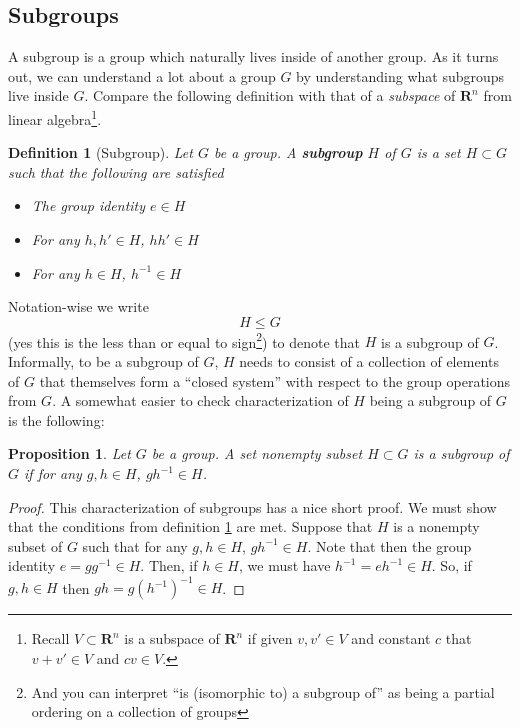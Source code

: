 \documentclass[12pt]{article}
\numberwithin{equation}{subsection}
\newtheorem{prop}[subsection]{Proposition}
\newtheorem{defn}[subsection]{Definition}
\theoremstyle{note}
\begin{document}
\subsection{Subgroups}
A subgroup is a group which naturally lives inside of another group. As it turns out, we can understand a lot about a group $G$ by understanding what subgroups live inside $G$. Compare the following definition with that of a \textit{subspace} of $\mathbf{R}^n$ from linear algebra\footnote{Recall $V\subset \mathbf{R}^n$ is a subspace of $\mathbf{R}^n$ if given $v,v'\in V$ and constant $c$ that $v+v'\in V$ and $cv\in V$.}. 

\begin{defn}[Subgroup] \label{subgroup}
	Let $G$ be a group. A \textbf{subgroup} $H$ of $G$ is a set $H\subset G$ such that the following are satisfied
	\begin{itemize}
		\item The group identity $e\in H$
		\item For any $h,h'\in H$, $h h'\in H$
		\item For any $h\in H$, $h^{-1}\in H$
	\end{itemize}
\end{defn}
Notation-wise we write \begin{equation} H\leq G \end{equation} (yes this is the less than or equal to sign\footnote{And you can interpret ``is (isomorphic to) a subgroup of'' as being a partial ordering on a collection of groups}) to denote that $H$ is a subgroup of $G$. Informally, to be a subgroup of $G$, $H$ needs to consist of a collection of elements of $G$ that themselves form a ``closed system'' with respect to the group operations from $G$. A somewhat easier to check characterization of $H$ being a subgroup of $G$ is the following:

\begin{prop}
	Let $G$ be a group. A set nonempty subset $H\subset G$ is a subgroup of $G$ if for any $g,h\in H$, $gh^{-1}\in H$.
\end{prop}
\begin{proof}
	This characterization of subgroups has a nice short proof. We must show that the conditions from definition \ref{subgroup} are met. Suppose that $H$ is a nonempty subset of $G$ such that for any $g,h\in H$, $gh^{-1}\in H$. Note that then the group identity $e=gg^{-1}\in H$. Then, if $h\in H$, we must have $h^{-1}=eh^{-1}\in H$. So, if $g,h\in H$ then $gh=g(h^{-1})^{-1}\in H$.    
\end{proof}
\end{document}

